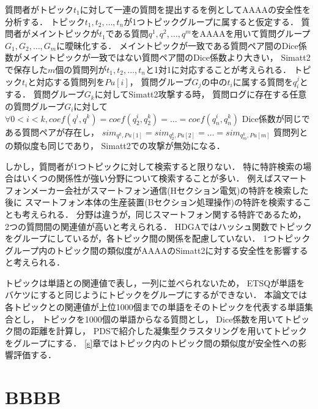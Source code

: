 \documentclass[master]{suribt}
\theoremstyle{definition}
\begin{document}
 質問者がトピック$t_1$に対して一連の質問を提出するを例としてAAAAの安全性を分析する．
 トピック$t_1,t_2, \dots ,t_n$が1つトピックグループに属すると仮定する．
 質問者がメイントピックが$t_1$である質問$q^1,q^2, \dots , q^m$をAAAAを用いて質問グループ$G_1,G_2, \dots , G_m$に曖昧化する．
 メイントピックが一致である質問ペア間のDice係数がメイントピックが一致ではない質問ペア間のDice係数より大きい，
 Simatt2で保存した$m$個の質問列が$t_1,t_2, \dots ,t_n$と1対1に対応することが考えられる．
 トピック$t_i$と対応する質問列を$Pu[i]$，
 質問グループ$G_j$の中の$t_i$に属する質問を$q^j_i$とする．
 質問グループ$G_k$に対してSimatt2攻撃する時，
 質問ログに存在する任意の質問グループ$G_i$に対して
 $\forall 0 < i < k, coef(q^i,q^k) = coef(q^i_2,q^k_2) = \dots = coef(q^i_n,q^k_n)$
 Dice係数が同じである質問ペアが存在し，
 $sim_{q^k,Pu[1]} = sim_{q^k_2,Pu[2]} = \dots = sim_{q^k_m,Pu[m]}$
 質問列との類似度も同じであり，
 Simatt2での攻撃が無効になる．

 しかし，質問者が1つトピックに対して検索すると限りない．
 特に特許検索の場合はいくつの関係性が強い分野について検索することが多い．
 例えばスマートフォンメーカー会社がスマートフォン通信(Hセクション電気)の特許を検索した後に
 スマートフォン本体の生産装置(Bセクション処理操作)の特許を検索することも考えられる． 
 分野は違うが，同じスマートフォン関する特許であるため，
 2つの質問間の関連値が高いと考えられる．
 HDGAではハッシュ関数でトピックをグループにしているが，各トピック間の関係を配慮していない．
 1つトピックグループ内のトピック間の類似度がAAAAのSimatt2に対する安全性を影響すると考えられる．

 トピックは単語との関連値で表し，一列に並べられないため，
 ETSQが単語をバケツにすると同じようにトピックをグループにするができない．
 本論文では各トピックとの関連値が上位1000個までの単語をそのトピックを代表する単語集合とし，
 トピックを1000個の単語からなる質問とし，
 Dice係数を用いてトピック間の距離を計算し，
 PDSで紹介した凝集型クラスタリングを用いてトピックをグループにする．
 \ref{s}章ではトピック内のトピック間の類似度が安全性への影響評価する．

 
 
 \section{BBBB}
 
\end{document}
